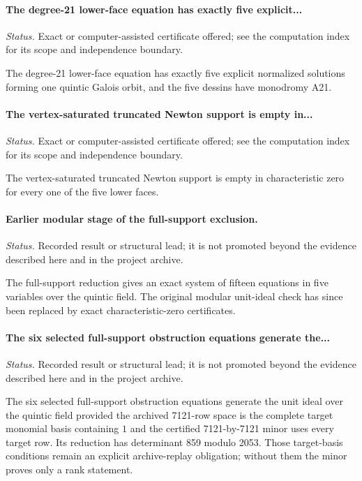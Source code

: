 \label{supp-note-06-015}
\paragraph{The degree-21 lower-face equation has exactly five explicit...}
\emph{Status.} Exact or computer-assisted certificate offered; see the computation index for its scope and independence boundary.

The degree-21 lower-face equation has exactly five explicit normalized solutions forming one quintic Galois orbit, and the five dessins have monodromy A21.

\label{supp-note-06-016}
\paragraph{The vertex-saturated truncated Newton support is empty in...}
\emph{Status.} Exact or computer-assisted certificate offered; see the computation index for its scope and independence boundary.

The vertex-saturated truncated Newton support is empty in characteristic zero for every one of the five lower faces.

\label{supp-note-06-017}
\paragraph{Earlier modular stage of the full-support exclusion.}
\emph{Status.} Recorded result or structural lead; it is not promoted beyond the evidence described here and in the project archive.

The full-support reduction gives an exact system of fifteen equations in five variables over the quintic field.  The original modular unit-ideal check has since been replaced by exact characteristic-zero certificates.

\label{supp-note-06-018}
\paragraph{The six selected full-support obstruction equations generate the...}
\emph{Status.} Recorded result or structural lead; it is not promoted beyond the evidence described here and in the project archive.

The six selected full-support obstruction equations generate the unit ideal over the quintic field provided the archived 7121-row space is the complete target monomial basis containing \(1\) and the certified 7121-by-7121 minor uses every target row.  Its reduction has determinant 859 modulo 2053.  Those target-basis conditions remain an explicit archive-replay obligation; without them the minor proves only a rank statement.

